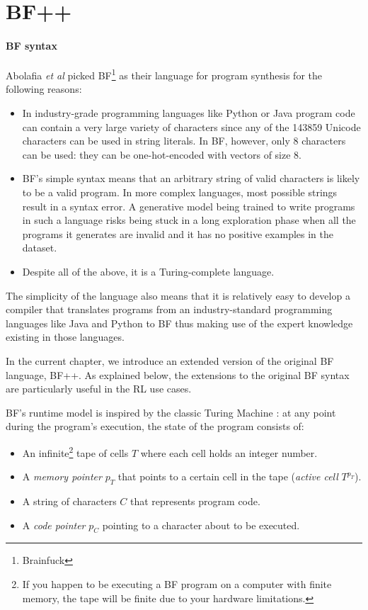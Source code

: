 
\section{BF++}
\label{sec:language}

\paragraph{BF syntax}
\label{sec:bf}

Abolafia {\sl et al} \cite{abolafiaNeuralProgramSynthesis2018} picked BF\footnote{Brainfuck} \cite{brainfuck} as their language for program synthesis for the following reasons:
\begin{itemize}
    \item In industry-grade programming languages like Python or Java program code can contain a very large variety of characters since any of the 143859 Unicode \cite{allenUnicodeStandard2012} characters can be used in string literals. In BF, however, only 8 characters can be used: they can be one-hot-encoded with vectors of size 8. 
    \item BF's simple syntax means that an arbitrary string of valid characters is likely to be a valid program. 
    In more complex languages, most possible strings result in a syntax error. 
    A generative model being trained to write programs in such a language risks being stuck in a long exploration phase when all the programs it generates are invalid and it has no positive examples in the dataset.
    \item Despite all of the above, it is a Turing-complete language.
\end{itemize}

The simplicity of the language also means that it is relatively easy to develop a compiler that translates programs from an industry-standard programming languages like Java and Python to BF thus making use of the expert knowledge existing in those languages. 

In the current chapter, we introduce an extended version of the original BF language, BF++. As explained below, the extensions to the original BF syntax are particularly useful in the RL use cases. 

BF's runtime model is inspired by the classic Turing Machine \cite{turing}: at any point during the program's execution, the state of the program consists of:

\begin{itemize}
    \item An infinite\footnote{If you happen to be executing a BF program on a computer with finite memory, the tape will be finite due to your hardware limitations.} tape of cells $T$ where each cell holds an integer number.
    \item A \textit{memory pointer} $p_T$ that points to a certain cell in the tape (\textit{active cell} $T^{p_T}$).
    \item A string of characters $C$ that represents program code.
    \item A \textit{code pointer} $p_C$ pointing to a character about to be executed.
\end{itemize}

